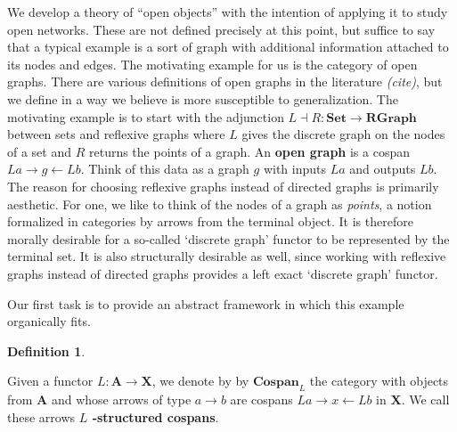 \documentclass{amsart}
\newcommand{\Set}{\cat{Set}}
\newcommand{\RGraph}{\cat{RGraph}}
\newcommand{\A}{\cat{A}}
\newcommand{\X}{\cat{X}}
\newcommand{\defn}[1]{\textbf{#1}}
\newcommand{\cat}[1]{\mathbf{#1}}
\newcommand{\from}{\colon}
\newcommand{\Cospan}{\mathbf{Cospan}}
\newenvironment{exposition}[1]{}{}
\theoremstyle{remark}
\theoremstyle{definition}
\newtheorem{definition}[theorem]{Definition}
\begin{document}
\begin{exposition}{}
  
  We develop a theory of ``open objects'' with the intention of
  applying it to study open networks.  These are not defined precisely
  at this point, but suffice to say that a typical example is a sort
  of graph with additional information attached to its nodes and
  edges.  The motivating example for us is the category of open
  graphs.  There are various definitions of open graphs in the
  literature \emph{(cite)}, but we define in a way we believe is more
  susceptible to generalization.  The motivating example is to start
  with the adjunction $ L \dashv R \from \Set \to \RGraph $
  between sets and reflexive graphs where $ L $ gives the
  discrete graph on the nodes of a set and $ R $ returns the points of
  a graph.  An \defn{open graph} is a cospan
  $ La \to g \gets Lb $.  Think of this data as a
  graph $ g $ with inputs $ La $ and outputs $ Lb $.
  The reason for choosing reflexive graphs instead of directed graphs
  is primarily aesthetic.  For one, we like to think of the nodes of a
  graph as \emph{points}, a notion formalized in categories by arrows
  from the terminal object.  It is therefore morally desirable for a
  so-called `discrete graph' functor to be represented by the terminal
  set. It is also structurally desirable as well, since working with
  reflexive graphs instead of directed graphs provides a left exact
  `discrete graph' functor.
 
  Our first task is to provide an abstract framework in which this
  example organically fits.

\end{exposition}

\begin{definition}
  \label{df:struct-cospan}

  Given a functor \( L \from \A \to \X \), we denote by
  by \( \Cospan_L \) the category with objects from \( \A \)
  and whose arrows of type \( a \to  b \) are cospans \( La \to x \gets Lb
  \) in \( \X \). We call these arrows \defn{ \( L \) -structured cospans}.
  
\end{definition}

\end{document}
